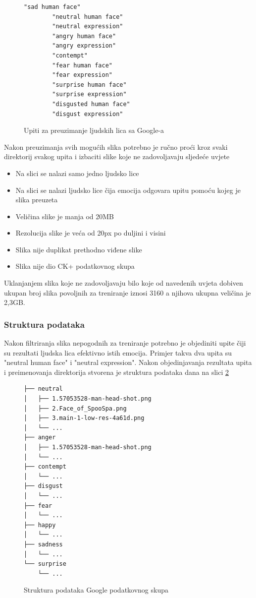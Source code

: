 \documentclass[times, utf8, zavrsni,numeric,pstricks]{fer}
\begin{document}
\begin{figure}[H]
	\centering
		\begin{Verbatim}[fontsize=\small]
		"sad human face"
		"neutral human face"
		"neutral expression"
		"angry human face"
		"angry expression"
		"contempt"
		"fear human face"
		"fear expression"
		"surprise human face"
		"surprise expression"
		"disgusted human face"
		"disgust expression"
		\end{Verbatim}
	\caption{Upiti za preuzimanje ljudskih lica sa Google-a}
	\label{cb:google_queries}
\end{figure}

\noindent
Nakon preuzimanja svih mogućih slika potrebno je ručno proći kroz svaki direktorij svakog upita i izbaciti slike koje ne zadovoljavaju sljedeće uvjete \label{google_npy_filter}

\begin{itemize}
	\item Na slici se nalazi samo jedno ljudsko lice
	\item Na slici se nalazi ljudsko lice čija emocija odgovara upitu pomoću kojeg je slika preuzeta
	\item Veličina slike je manja od 20MB
	\item Rezolucija slike je veća od 20px po duljini i visini
	\item Slika nije duplikat prethodno viđene slike
	\item Slika nije dio CK+ podatkovnog skupa
\end{itemize}
Uklanjanjem slika koje ne zadovoljavaju bilo koje od navedenih uvjeta dobiven ukupan broj slika povoljnih za treniranje iznosi 3160 a njihova ukupna veličina je 2,3GB.

\subsubsection{Struktura podataka}
Nakon filtriranja slika nepogodnih za treniranje potrebno je objediniti upite čiji su rezultati ljudska lica efektivno istih emocija. Primjer takva dva upita su "neutral human face" i "neutral expression". Nakon objedinjavanja rezultata upita i preimenovanja direktorija stvorena je struktura podataka dana na slici \ref{cb:google_file_structure}


\begin{figure}[H]
\centering
\begin{Verbatim}[fontsize=\small]
├── neutral
│   ├── 1.57053528-man-head-shot.png
│   ├── 2.Face_of_SpooSpa.png
│   ├── 3.main-1-low-res-4a61d.png
│   └── ...
├── anger
│   ├── 1.57053528-man-head-shot.png
│   └── ...
├── contempt
│   └── ...
├── disgust
│   └── ...
├── fear
│   └── ...
├── happy
│   └── ...
├── sadness
│   └── ...
└── surprise
    └── ...
\end{Verbatim}
\caption{Struktura podataka Google podatkovnog skupa}
\label{cb:google_file_structure}
\end{figure}
\end{document}
